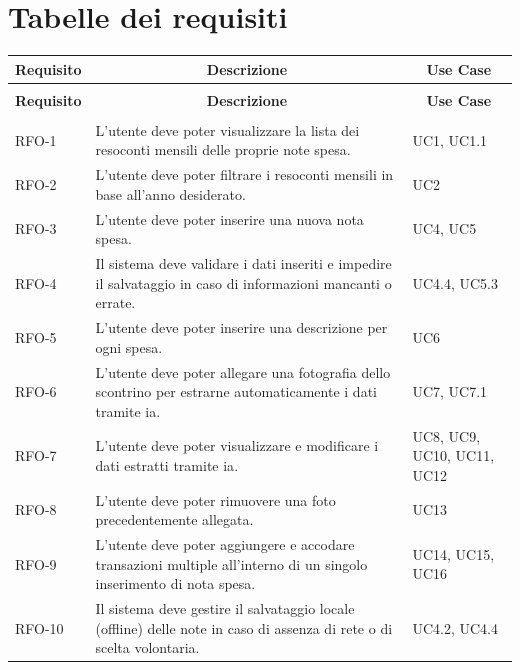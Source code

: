 \section{Tabelle dei requisiti}
\begin{center}
    \begin{longtable}{|p{2.15cm}|p{7.75cm}|p{2.35cm}|}
    \hline
    \multicolumn{1}{|c|}{\textbf{Requisito}} & \multicolumn{1}{c|}{\textbf{Descrizione}} & \multicolumn{1}{c|}{\textbf{Use Case}}\\
    \hline 
    \endfirsthead
    \rowcolor{white}
    \multicolumn{3}{c}{{\bfseries \tablename\ \thetable{} -- Continuo della tabella}}\\
    \hline
    \multicolumn{1}{|c|}{\textbf{Requisito}} & \multicolumn{1}{c|}{\textbf{Descrizione}} & \multicolumn{1}{c|}{\textbf{Use Case}}\\
    \hline 
    \endhead
    \hline
    \rowcolor{white}
    \multicolumn{3}{|r|}{{Continua nella prossima pagina...}}\\
    \hline
    \endfoot
    \endlastfoot
    RFO-1 & L'utente deve poter visualizzare la lista dei resoconti mensili delle proprie note spesa. & UC1, UC1.1 \\ \hline
    RFO-2 & L'utente deve poter filtrare i resoconti mensili in base all'anno desiderato. & UC2 \\ \hline
    RFO-3 & L'utente deve poter inserire una nuova nota spesa. & UC4, UC5 \\ \hline
    RFO-4 & Il sistema deve validare i dati inseriti e impedire il salvataggio in caso di informazioni mancanti o errate. & UC4.4, UC5.3 \\ \hline
    RFO-5 &  L'utente deve poter inserire una descrizione per ogni spesa. & UC6 \\ \hline
    RFO-6 & L'utente deve poter allegare una fotografia dello scontrino per estrarne automaticamente i dati tramite \gls{ia}. & UC7, UC7.1 \\ \hline
    RFO-7 & L'utente deve poter visualizzare e modificare i dati estratti tramite \gls{ia}. & UC8, UC9, UC10, UC11, UC12 \\ \hline
    RFO-8 & L'utente deve poter rimuovere una foto precedentemente allegata. & UC13 \\ \hline
    RFO-9 & L'utente deve poter aggiungere e accodare transazioni multiple all'interno di un singolo inserimento di nota spesa. & UC14, UC15, UC16 \\ \hline
    RFO-10 & Il sistema deve gestire il salvataggio locale (offline) delle note in caso di assenza di rete o di scelta volontaria. & UC4.2, UC4.4 \\ \hline

\end{longtable}
\end{center}
